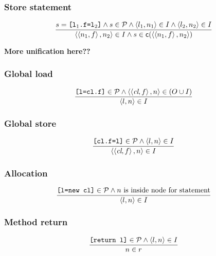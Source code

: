 \documentclass[11pt,notitlepage]{article}
\newcommand{\bigvar}[1]{\ensuremath{\text{\it #1}}}
\newcommand{\func}[1]{\ensuremath{\text{\sffamily #1}}}
\begin{document}
\subsubsection{Store statement}

\begin{displaymath}
\dfrac
{s=\text{\tt [l$_1$.f=l$_2$]}\wedge s\in\mathcal{P} \wedge
 \tuple{l_1,n_1}\in I \wedge
 \tuple{l_2,n_2}\in I }
{\tuple{\tuple{n_1,f},n_2}\in I \wedge
 s\in \func{c}(\tuple{\tuple{n_1,f},n_2}) }
\end{displaymath}

\textbf{More unification here??}

\subsubsection{Global load}

\begin{displaymath}
\dfrac
{\text{\tt [l=cl.f]}\in\mathcal{P} \wedge
 \tuple{\tuple{\bigvar{cl},f},n}\in (O\cup I) }
{\tuple{l,n}\in I}
\end{displaymath}

\subsubsection{Global store}

\begin{displaymath}
\dfrac
{\text{\tt [cl.f=l]}\in\mathcal{P} \wedge
 \tuple{l,n}\in I}
{\tuple{\tuple{\bigvar{cl},f},n}\in I}
\end{displaymath}

\subsubsection{Allocation}

\begin{displaymath}
\dfrac
{\text{\tt [l=new cl]}\in\mathcal{P} \wedge
 n \text{ is inside node for statement} }
{\left\langle l,n \right\rangle\in I}
\end{displaymath}

\subsubsection{Method return}

\begin{displaymath}
\dfrac
{\text{\tt [return l]}\in\mathcal{P} \wedge
 \left\langle l,n \right\rangle\in I}
{n\in r}
\end{displaymath}
\end{document}
